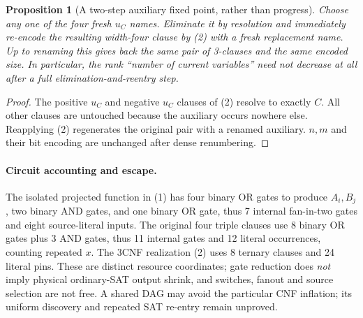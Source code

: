 \documentclass[10pt]{article}
\newtheorem{proposition}[theorem]{Proposition}
\begin{document}
\begin{proposition}[A two-step auxiliary fixed point, rather than progress]\label{prop:aux}
Choose any one of the four fresh $u_C$ names. Eliminate it by resolution and immediately re-encode the resulting width-four clause by (2) with a fresh replacement name. Up to renaming this gives back the same pair of 3-clauses and the same encoded size. In particular, the rank ``number of current variables'' need not decrease at all after a full elimination-and-reentry step.
\end{proposition}
\begin{proof}
The positive $u_C$ and negative $u_C$ clauses of (2) resolve to exactly $C$. All other clauses are untouched because the auxiliary occurs nowhere else. Reapplying (2) regenerates the original pair with a renamed auxiliary. $n,m$ and their bit encoding are unchanged after dense renumbering.
\end{proof}
\paragraph{Circuit accounting and escape.} The isolated projected function in (1) has four binary OR gates to produce $A_i,B_j$, two binary AND gates, and one binary OR gate, thus 7 internal fan-in-two gates and eight source-literal inputs. The original four triple clauses use 8 binary OR gates plus 3 AND gates, thus 11 internal gates and 12 literal occurrences, counting repeated $x$. The 3CNF realization (2) uses 8 ternary clauses and 24 literal pins. These are distinct resource coordinates; gate reduction does \emph{not} imply physical ordinary-SAT output shrink, and switches, fanout and source selection are not free. A shared DAG may avoid the particular CNF inflation; its uniform discovery and repeated SAT re-entry remain unproved.
\end{document}
